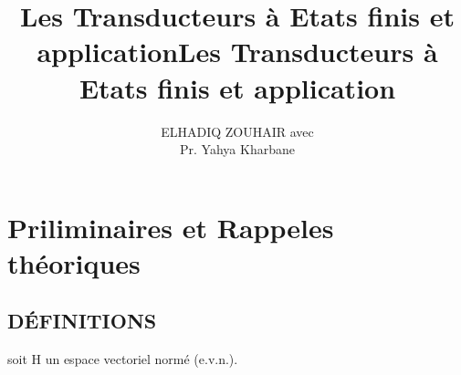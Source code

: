 \documentclass[12pt,a4paper]{article}
\title{Les Transducteurs à Etats finis et application}
\title{Les Transducteurs à Etats finis et application}
\author{ELHADIQ ZOUHAIR avec \\  Pr. Yahya Kharbane}
\begin{document}
\maketitle
\tableofcontents
\chapter{Priliminaires et Rappeles théoriques}
\section{DÉFINITIONS}soit H un espace vectoriel normé (e.v.n.). 
\end{document}
